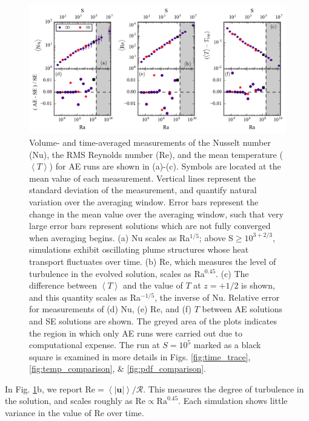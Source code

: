 \documentclass[aps, pre, onecolumn, nofootinbib, notitlepage, groupedaddress, amsfonts, amssymb, amsmath, longbibliography]{revtex4-1}
\newcommand{\angles}[1]{\ensuremath{\left\langle #1 \right\rangle}}
\begin{document}
\begin{figure}[b]
\includegraphics[width=\textwidth]{./figs/parameter_space_comparison.png}
\caption{Volume- and time-averaged measurements of the Nusselt number (Nu), the
RMS Reynolds number (Re), and the mean temperature ($\angles{T}$) for AE runs are shown in (a)-(c).
Symbols are located at the mean value of
each measurement.  Vertical lines represent the standard deviation of the measurement,
and quantify natural variation over the
averaging window. Error bars represent the change in the mean value over the averaging window,
such that very large error bars represent solutions which are not fully converged when averaging
begins.
(a) Nu scales as Ra$^{1/5}$; above S$\geq 10^{3+2/3}$,
simulations exhibit oscillating plume structures whose heat transport fluctuates over time.  
(b) Re, which measures the level of turbulence in the evolved solution, scales as
Ra$^{0.45}$. (c) The difference between $\angles{T}$ and the value of $T$ at $z = +1/2$
is shown, and this quantity scales as Ra$^{-1/5}$, the inverse of Nu.
Relative error for measurements of (d) Nu, (e) Re, and (f) $T$ between 
AE solutions and SE solutions are shown.
The greyed area of the plots indicates the region in which only AE runs were
carried out due to computational expense. The run at $S = 10^5$ marked as a
black square is examined in more details in Figs. \ref{fig:time_trace},
\ref{fig:temp_comparison}, \& \ref{fig:pdf_comparison}.
\label{fig:parameter_space_comparison} }
\end{figure}



In Fig. \ref{fig:parameter_space_comparison}b, we report 
$\text{Re} = \angles{|\bm{u}|} / \mathcal{R}$.  This measures the degree of
turbulence in the solution, and scales roughly as
$\text{Re} \propto \text{Ra}^{0.45}$. Each simulation shows little variance in
the value of Re over time.
\end{document}
